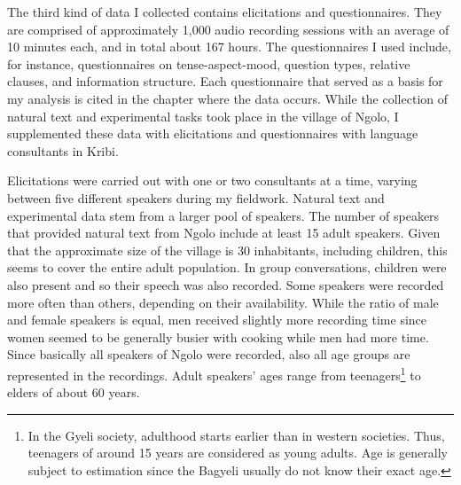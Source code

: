 The third kind of data I collected contains elicitations and questionnaires. They are comprised of approximately 1,000 audio recording sessions with an average of 10 minutes each, and in total about 167 hours.
The questionnaires I used include, for instance, questionnaires on tense-aspect-mood, question types, relative clauses, and information structure. Each questionnaire that served as a basis for my analysis is cited in the chapter where the data occurs.
While the collection of natural text and experimental tasks took place in the village of Ngolo, I supplemented these data with elicitations and questionnaires with language consultants in Kribi. %

Elicitations were carried out with one or two consultants at a time, varying between five different speakers during my fieldwork. Natural text and experimental data stem from a larger pool of speakers.
The number of speakers that provided natural text from Ngolo include at least 15 adult speakers. 
Given that the approximate size of the village is 30 inhabitants, including children, this seems to cover the entire adult population. In group conversations, children were also present and so their speech was also recorded.
Some speakers were recorded more often than others, depending on their availability. While the ratio of male and female speakers is equal, men received slightly more recording time since women seemed to be generally busier with cooking while men had more time. Since basically all speakers of Ngolo were recorded, also all age groups are represented in the recordings. Adult speakers' ages range from teenagers\footnote{In the Gyeli society, adulthood starts earlier than in western societies. Thus, teenagers of around 15 years are considered as young adults. Age is generally subject to estimation since the Bagyeli usually do not know their exact age.} to elders of about 60 years.   


